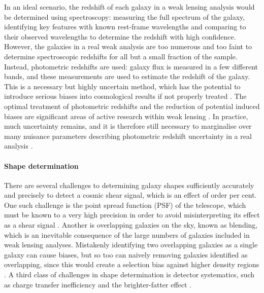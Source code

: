 In an ideal scenario, the redshift of each galaxy in a weak lensing analysis would be determined using spectroscopy: measuring the full spectrum of the galaxy, identifying key features with known rest-frame wavelengths and comparing to their observed wavelengths to determine the redshift with high confidence. However, the galaxies in a real weak analysis are too numerous and too faint to determine spectroscopic redshifts for all but a small fraction of the sample. Instead, photometric redshifts are used: galaxy flux is measured in a few different bands, and these measurements are used to estimate the redshift of the galaxy. This is a necessary but highly uncertain method, which has the potential to introduce serious biases into cosmological results if not properly treated \citep{Sun2009, Hearin2010}. The optimal treatment of photometric redshifts and the reduction of potential induced biases are significant areas of active research within weak lensing \citep{DIsanto2018, Graham2018, Bilicki2018, Pasquet2019, Amaro2019, Leistedt2019, Boucaud2020, Wright2020, Schmidt2020, Schuldt2021, Henghes2021, Cordero2021, Lima2022, Rau2022}. In practice, much uncertainty remains, and it is therefore still necessary to marginalise over many nuisance parameters describing photometric redshift uncertainty in a real analysis \citep[e.g.][]{Heymans2021, DES2021}.

\paragraph{Shape determination}

There are several challenges to determining galaxy shapes sufficiently accurately and precisely to detect a cosmic shear signal, which is an effect of order per cent. One such challenge is the point spread function (PSF) of the telescope, which must be known to a very high precision in order to avoid misinterpreting its effect as a shear signal \citep{Kuijken1999, Jarvis2004, Rhodes2007, Rowe2010, Chang2012, Lu2017, Eriksen2018, Zhang2022}. Another is overlapping galaxies on the sky, known as blending, which is an inevitable consequence of the large numbers of galaxies included in weak lensing analyses. Mistakenly identifying two overlapping galaxies as a single galaxy can cause biases, but so too can naively removing galaxies identified as overlapping, since this would create a selection bias against higher density regions \citep{Dawson2016, Hoekstra2021, Gaztanaga2021, Sanchez2021, Melchior2021,  Nourbakhsh2021}. A third class of challenges in shape determination is detector systematics, such as charge transfer inefficiency \citep{Rhodes2010} and the brighter-fatter effect \citep{Walter2015, Gilbertson2017, Coulton2018, Rowlands2018, Freudenburg2020}.

